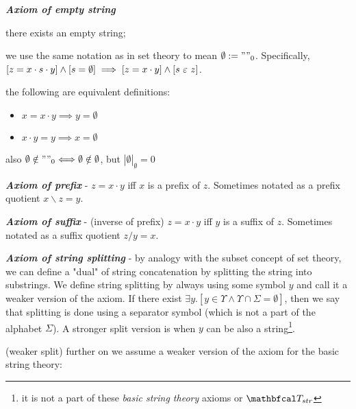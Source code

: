 \begin{definition}
\begin{legal}
\begin{legal}
    \end{legal}
    \item \textbf{\textit{Axiom of empty string}}
    \begin{legal}
      \item there exists an empty string;
      \item we use the same notation as in set theory to mean $\emptyset := ""_0$. Specifically, $[z = x \cdot s \cdot y] \land [s = \emptyset] \implies [z = x \cdot y] \land [s \ \varepsilon\  z]$. \item the following are equivalent definitions:
          \begin{itemize}
            \item $x = x \cdot y \implies y = \emptyset$
            \item $x \cdot y = y \implies x = \emptyset$
          \end{itemize}
      \item also $\emptyset \notin ""_0 \Longleftrightarrow \emptyset \notin \emptyset$, but $|\emptyset|_\emptyset = 0$
    \end{legal}
    \item \textbf{\textit{Axiom of prefix}} - $z = x \cdot y$ iff $x$ is a prefix of $z$. Sometimes notated as a prefix quotient $x \backslash z = y$.
    \item \textbf{\textit{Axiom of suffix}} - (inverse of prefix) $z = x \cdot y$ iff $y$ is a suffix of $z$. Sometimes notated as a suffix quotient $z / y = x$.
    \item \textbf{\textit{Axiom of string splitting}} - by analogy with the subset concept of set theory, we can define a "dual" of string concatenation by splitting the string into substrings. We define string splitting by always using some symbol $y$ and call it a weaker version of the axiom. If there exist $\exists y.[y \in \Upsilon \land \Upsilon \cap \Sigma = \emptyset]$, then we say that splitting is done using a separator symbol (which is not a part of the alphabet $\Sigma$). A stronger split version is when $y$ can be also a string\footnote{it is not a part of these \textit{basic string theory} axioms or $\LsT_{str}$}.
    \begin{legal}
      \item (weaker split) further on we assume a weaker version of the axiom for the basic string theory:
      \begin{legal}

\end{legal}
\end{legal}
\end{legal}
\end{definition}

